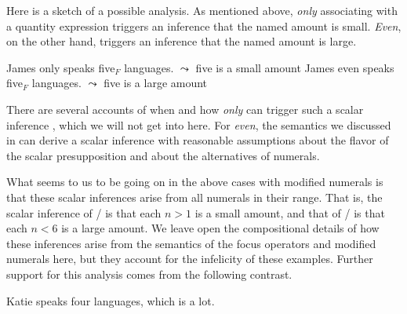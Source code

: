\documentclass[output=paper]{langscibook}
\begin{document}
\noindent Here is a sketch of a possible analysis. As mentioned above, \textit{only} associating with a quantity expression triggers an inference that the named amount is small. \textit{Even}, on the other hand, triggers an inference that the named amount is large.

\ea
  \ea James only speaks five$_F$ languages.
  \hfill $\leadsto$ five is a small amount
  \ex James even speaks five$_F$ languages.
  \hfill $\leadsto$ five is a large amount
  \z
\z

\noindent There are several accounts of when and how \textit{only} can trigger such a scalar inference \citep{grosz, coppockbeaver, alxatib}, which we will not get into here. For \textit{even}, the semantics we discussed in  can derive a scalar inference with reasonable assumptions about the flavor of the scalar presupposition and about the alternatives of numerals.

What seems to us to be going on in the above cases with modified numerals is that these scalar inferences arise from all numerals in their range. That is, the scalar inference of / is that each $n>1$ is a small amount, and that of / is that each $n<6$ is a large amount. We leave open the compositional details of how these inferences arise from the semantics of the focus operators and modified numerals here, but they account for the infelicity of these examples. Further support for this analysis comes from the following contrast.

\ea Katie speaks four languages, which is a lot.
  \z
\z

{\sloppy\printbibliography[heading=subbibliography,notkeyword=this]}
\end{document}
